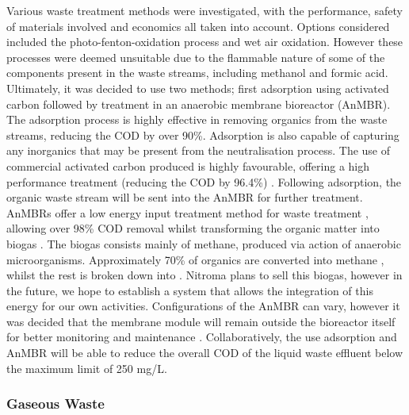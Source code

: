 Various waste treatment methods were investigated, with the performance,  safety of materials involved and economics all taken into account. Options considered included the photo-fenton-oxidation process and wet air oxidation. However these processes were deemed unsuitable due to the flammable nature of some of the components present in the waste streams, including methanol and formic acid. Ultimately, it was decided to use two methods; first adsorption using activated carbon followed by treatment in an anaerobic membrane bioreactor (AnMBR). The adsorption process is highly effective in removing organics from the waste streams, reducing the COD by over 90\%. Adsorption is also capable of capturing any inorganics that may be present from the neutralisation process. The use of commercial activated carbon produced is highly favourable,  offering a high performance treatment (reducing the COD by 96.4\%) \cite{aluyor_cod_2008}. Following adsorption, the organic waste stream will be sent into the AnMBR for further treatment. AnMBRs offer a low energy input treatment method for waste treatment \cite{maaz_anaerobic_2019}, allowing over 98\% COD removal whilst transforming the organic matter into biogas \cite{chen_brewery_2016}. The biogas consists mainly of methane, produced via action of anaerobic microorganisms. Approximately 70\% of organics are converted into methane \cite{ariunbaatar_performance_2021}, whilst the rest is broken down into . Nitroma plans to sell this biogas, however in the future, we hope to establish a system that allows the integration of this energy for our own activities. Configurations of the AnMBR can vary, however it was decided that the membrane module will remain outside the bioreactor itself for better monitoring and maintenance \cite{maaz_anaerobic_2019}. Collaboratively, the use adsorption and AnMBR will be able to reduce the overall COD of the liquid waste effluent below the maximum limit of 250 mg/L. 

\subsubsection{Gaseous Waste}

